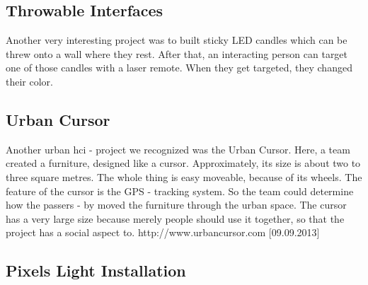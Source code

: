 \subsection{Throwable Interfaces}
Another very interesting project was to built sticky LED candles which can be threw onto a wall where they rest. After that, an interacting person can target one of those candles with a laser remote. When they get targeted, they changed their color. \newline

\subsection{Urban Cursor}


Another urban hci - project we recognized was the Urban Cursor.\newline 
Here, a team created a furniture, designed like a cursor. Approximately, its size is about two to three square metres. The whole thing is easy moveable, because of its wheels. The feature of the cursor is the GPS - tracking system. So the team could determine how the passers - by moved the furniture through the urban space.\newline
The cursor has a very large size because merely people should use it together, so that the project has a social aspect to.
http://www.urbancursor.com [09.09.2013] 

\subsection{Pixels Light Installation}

